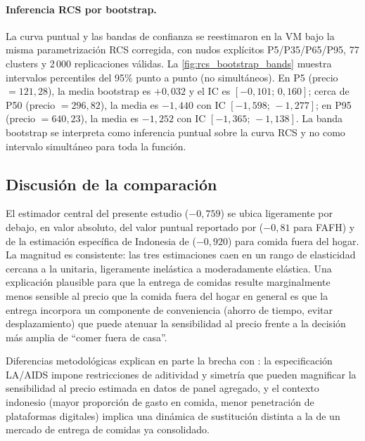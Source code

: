 \documentclass[doc, a4paper, biblatex, floatsintext, longtable, babel]{apa7}
\begin{document}
\paragraph{Inferencia RCS por bootstrap.} La curva puntual y las bandas de confianza se reestimaron en la VM bajo la misma parametrización RCS corregida, con nudos explícitos P5/P35/P65/P95, 77 clusters y 2\,000 replicaciones válidas. La \cref{fig:rcs_bootstrap_bands} muestra intervalos percentiles del 95\% punto a punto (no simultáneos). En P5 (precio $=121,28$), la media bootstrap es $+0,032$ y el IC es $[-0,101;\,0,160]$; cerca de P50 (precio $=296,82$), la media es $-1,440$ con IC $[-1,598;\,-1,277]$; en P95 (precio $=640,23$), la media es $-1,252$ con IC $[-1,365;\,-1,138]$. La banda bootstrap se interpreta como inferencia puntual sobre la curva RCS y no como intervalo simultáneo para toda la función.




\subsection{Discusi\'on de la comparaci\'on}
\label{subsec:discusion_comparacion}

El estimador central del presente estudio ($-0,759$) se ubica ligeramente por debajo, en valor absoluto, del valor puntual reportado por \textcite{andreyeva2010} ($-0,81$ para FAFH) y de la estimaci\'on espec\'ifica de Indonesia de \textcite{damayanti2023} ($-0,920$) para comida fuera del hogar. La magnitud es consistente: las tres estimaciones caen en un rango de elasticidad cercana a la unitaria, ligeramente inel\'astica a moderadamente el\'astica. Una explicaci\'on plausible para que la entrega de comidas resulte marginalmente menos sensible al precio que la comida fuera del hogar en general es que la entrega incorpora un componente de conveniencia (ahorro de tiempo, evitar desplazamiento) que puede atenuar la sensibilidad al precio frente a la decisi\'on m\'as amplia de ``comer fuera de casa''.

Diferencias metodol\'ogicas explican en parte la brecha con \textcite{damayanti2023}: la especificaci\'on LA/AIDS impone restricciones de aditividad y simetr\'ia que pueden magnificar la sensibilidad al precio estimada en datos de panel agregado, y el contexto indonesio (mayor proporci\'on de gasto en comida, menor penetraci\'on de plataformas digitales) implica una din\'amica de sustituci\'on distinta a la de un mercado de entrega de comidas ya consolidado.
\end{document}
